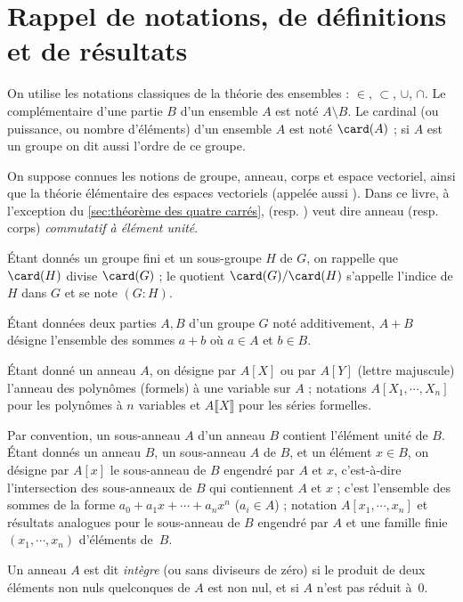 \documentclass[11pt, %
  title in boldface,
  theorem in new line,
  theorem numbering = section,
  number theorems separately,
  simple name,
]{beaulivre}
\begin{document}
\chapter{Rappel de notations, de définitions et de résultats}

    On utilise les notations classiques de la théorie des ensembles : \( \in \), \( \subset \), \( \cup \), \( \cap \). Le complémentaire d'une partie \( B \) d'un ensemble \( A \) est noté \( A \setminus B \). Le cardinal (ou puissance, ou nombre d'éléments) d'un ensemble \( A \) est noté \( \card(A) \) ; si \( A \) est un groupe on dit aussi l'ordre de ce groupe.

    On suppose connues les notions de groupe, anneau, corps et espace vectoriel, ainsi que la théorie élémentaire des espaces vectoriels (appelée aussi ). Dans ce livre, à l'exception du \cref{sec:théorème des quatre carrés},  (resp. ) veut dire anneau (resp. corps) \emph{commutatif à élément unité}.

    Étant donnés un groupe fini et un sous-groupe \( H \) de \( G \), on rappelle que \( \card(H) \) divise \( \card(G) \) ; le quotient \( \card(G)/\card(H) \) s'appelle l'indice de \( H \) dans \( G \) et se note \( (G:H) \).

    Étant données deux parties \( A , B \) d'un groupe \( G \) noté additivement, \( A+B \) désigne l'ensemble des sommes \( a+b \) où \( a \in A \) et \( b \in B \).

    Étant donné un anneau \( A \), on désigne par \( A[X] \) ou par \( A[Y] \) (lettre majuscule) l'anneau des polynômes (formels) à une variable sur \( A \) ; notations \( A[X_1, \cdots, X_n] \) pour les polynômes à \( n \) variables et \( A\lBrack X \rBrack \) pour les séries formelles.

    Par convention, un sous-anneau \( A \) d'un anneau \( B \) contient l'élément unité de \( B \). Étant donnés un anneau \( B \), un sous-anneau \( A \) de \( B \), et un élément \( x \in B \), on désigne par \( A[x] \) le sous-anneau de \( B \) engendré par \( A \) et \( x \), c'est-à-dire l'intersection des sous-anneaux de \( B \) qui contiennent \( A \) et \( x \) ; c'est l'ensemble des sommes de la forme \( a_0 + a_1 x + \cdots + a_n x^n \) (\( a_i \in A \)) ; notation \( A[x_1, \cdots, x_n] \) et résultats analogues pour le sous-anneau de \( B \) engendré par \( A \) et une famille finie \( (x_1, \cdots, x_n) \) d'éléments de~\( B \).

    Un anneau \( A \) est dit \emph{intègre} (ou sans diviseurs de zéro) si le produit de deux éléments non nuls quelconques de \( A \) est non nul, et si \( A \) n'est pas réduit à~\( 0 \).
\end{document}
